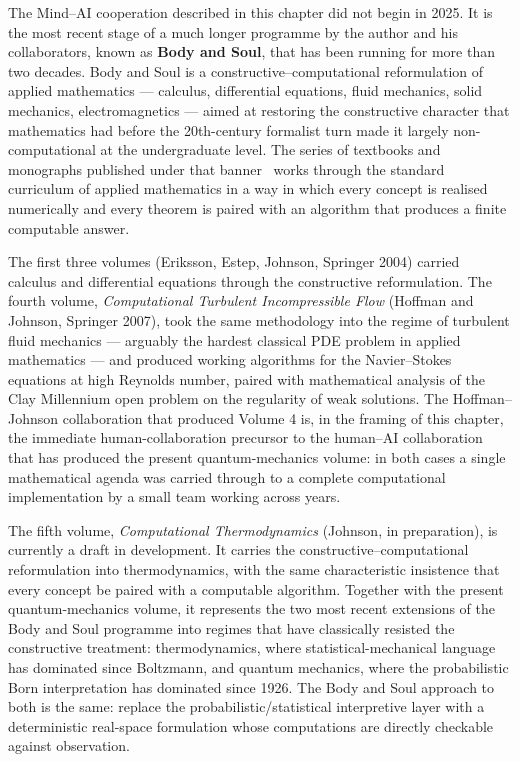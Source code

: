 The Mind--AI cooperation described in this chapter did not begin in 2025. It is the most recent stage of a much longer programme by the author and his collaborators, known as \textbf{Body and Soul}, that has been running for more than two decades. Body and Soul is a constructive--computational reformulation of applied mathematics --- calculus, differential equations, fluid mechanics, solid mechanics, electromagnetics --- aimed at restoring the constructive character that mathematics had before the 20th-century formalist turn made it largely non-computational at the undergraduate level. The series of textbooks and monographs published under that banner~\cite{BodyAndSoulI,BodyAndSoulII,BodyAndSoulIII,BodyAndSoulIV,BodyAndSoulV} works through the standard curriculum of applied mathematics in a way in which every concept is realised numerically and every theorem is paired with an algorithm that produces a finite computable answer.

The first three volumes (Eriksson, Estep, Johnson, Springer 2004) carried calculus and differential equations through the constructive reformulation. The fourth volume, \emph{Computational Turbulent Incompressible Flow} (Hoffman and Johnson, Springer 2007), took the same methodology into the regime of turbulent fluid mechanics --- arguably the hardest classical PDE problem in applied mathematics --- and produced working algorithms for the Navier--Stokes equations at high Reynolds number, paired with mathematical analysis of the Clay Millennium open problem on the regularity of weak solutions. The Hoffman--Johnson collaboration that produced Volume 4 is, in the framing of this chapter, the immediate human-collaboration precursor to the human--AI collaboration that has produced the present quantum-mechanics volume: in both cases a single mathematical agenda was carried through to a complete computational implementation by a small team working across years.

The fifth volume, \emph{Computational Thermodynamics} (Johnson, in preparation), is currently a draft in development. It carries the constructive--computational reformulation into thermodynamics, with the same characteristic insistence that every concept be paired with a computable algorithm. Together with the present quantum-mechanics volume, it represents the two most recent extensions of the Body and Soul programme into regimes that have classically resisted the constructive treatment: thermodynamics, where statistical-mechanical language has dominated since Boltzmann, and quantum mechanics, where the probabilistic Born interpretation has dominated since 1926. The Body and Soul approach to both is the same: replace the probabilistic/statistical interpretive layer with a deterministic real-space formulation whose computations are directly checkable against observation.

